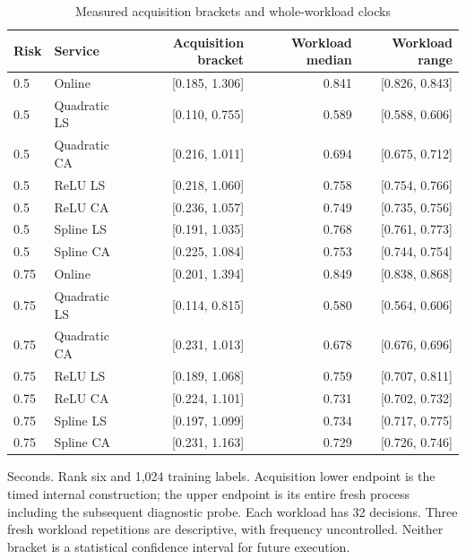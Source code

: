 \begin{table}[t]
\centering\small
\caption{Measured acquisition brackets and whole-workload clocks}\label{tab:clocks97}
\begin{tabular}{llrrr}\toprule
Risk & Service & Acquisition bracket & Workload median & Workload range \\ \midrule
0.5 & Online & [0.185, 1.306] & 0.841 & [0.826, 0.843] \\
0.5 & Quadratic LS & [0.110, 0.755] & 0.589 & [0.588, 0.606] \\
0.5 & Quadratic CA & [0.216, 1.011] & 0.694 & [0.675, 0.712] \\
0.5 & ReLU LS & [0.218, 1.060] & 0.758 & [0.754, 0.766] \\
0.5 & ReLU CA & [0.236, 1.057] & 0.749 & [0.735, 0.756] \\
0.5 & Spline LS & [0.191, 1.035] & 0.768 & [0.761, 0.773] \\
0.5 & Spline CA & [0.225, 1.084] & 0.753 & [0.744, 0.754] \\
0.75 & Online & [0.201, 1.394] & 0.849 & [0.838, 0.868] \\
0.75 & Quadratic LS & [0.114, 0.815] & 0.580 & [0.564, 0.606] \\
0.75 & Quadratic CA & [0.231, 1.013] & 0.678 & [0.676, 0.696] \\
0.75 & ReLU LS & [0.189, 1.068] & 0.759 & [0.707, 0.811] \\
0.75 & ReLU CA & [0.224, 1.101] & 0.731 & [0.702, 0.732] \\
0.75 & Spline LS & [0.197, 1.099] & 0.734 & [0.717, 0.775] \\
0.75 & Spline CA & [0.231, 1.163] & 0.729 & [0.726, 0.746] \\
\bottomrule\end{tabular}
\par\smallskip\parbox{\linewidth}{\footnotesize Seconds. Rank six and 1,024 training labels. Acquisition lower endpoint is the timed internal construction; the upper endpoint is its entire fresh process including the subsequent diagnostic probe. Each workload has 32 decisions. Three fresh workload repetitions are descriptive, with frequency uncontrolled. Neither bracket is a statistical confidence interval for future execution.}
\end{table}
